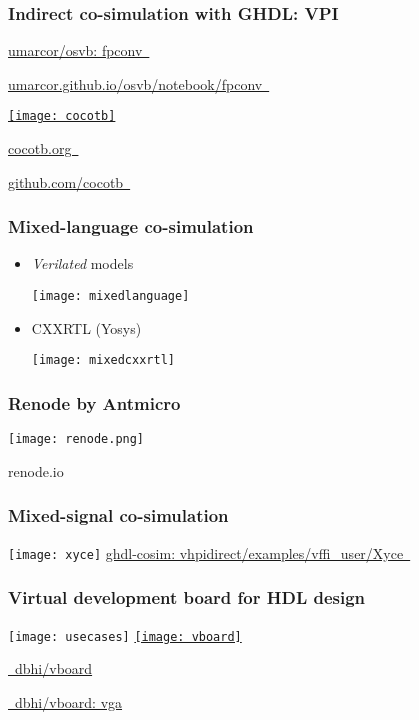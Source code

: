 \documentclass[xcolor={usenames,dvipsnames}]{beamer}
\begin{document}
\begin{frame}
\frametitle{Indirect co-simulation with GHDL: VPI}
\centering
\Large

\href{https://github.com/umarcor/osvb/tree/main/fpconv}{umarcor/osvb: fpconv~\faCode}

\href{https://umarcor.github.io/osvb/notebook/fpconv.html}{umarcor.github.io/osvb/notebook/fpconv~\faGlobe}

\vfill

\href{https://www.cocotb.org/}{\texttt{[image: cocotb]}}

\href{https://www.cocotb.org/}{cocotb.org~\faGlobe}

\href{https://github.com/cocotb/}{github.com/cocotb~\faCode}

\end{frame}

\begin{frame}
\frametitle{Mixed-language co-simulation}

\begin{itemize}
  \item \emph{Verilated} models

    \vfill
    \texttt{[image: mixedlanguage]}
    \vfill

  \item CXXRTL (Yosys)

    \vfill
    \texttt{[image: mixedcxxrtl]}
    \vfill
\end{itemize}
\end{frame}

\begin{frame}
  \frametitle{Renode by Antmicro}
  \centering
  \texttt{[image: renode.png]}

  \vfill
  \Large
  renode.io
  \href{https://renode.io/}{\faGlobe}
  \href{https://docs.google.com/presentation/d/1j0gjI4pVkgF9CWvxaxr5XuCKakEB25YX2n-iFxlYKnE}{\faSlideshare}
\end{frame}

\begin{frame}
\frametitle{Mixed-signal co-simulation}
\centering
\texttt{[image: xyce]}
\vfill
\Large
\href{https://ghdl.github.io/ghdl-cosim/vhpidirect/examples/vffi_user.html\#xyce}{ghdl-cosim: vhpidirect/examples/vffi\_user/Xyce~\faGlobe}
\end{frame}

\begin{frame}
  \frametitle{Virtual development board for HDL design}
  \centering
  \texttt{[image: usecases]}
  \vfill
  \href{https://github.com/dbhi/vboard}{\texttt{[image: vboard]}}

  \Large \href{https://github.com/dbhi/vboard}{\faGithub~dbhi/vboard}

  \href{https://github.com/dbhi/vboard/tree/main/vga}{\faCode~dbhi/vboard: vga}
  \end{frame}
\end{document}
